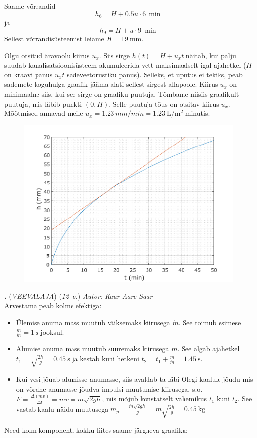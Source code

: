 \documentclass[11pt,a5paper]{article}
\newcommand{\numb}[1]{\vspace{5pt}\textbf{\large #1}}
\newcommand{\nimi}[1]{(\textsl{\small #1})}
\newcommand{\punktid}[1]{(\emph{#1~p.})}
\newcounter{ylesanne}
\newcommand{\yl}[1]{\addtocounter{ylesanne}{1}\numb{\theylesanne.} \nimi{#1} \newblock{}}
\newcommand{\autor}[1]{\emph{Autor: #1}}%
\begin{document}
Saame võrrandid
\[
h_6 = H +0.5 u \cdot \SI{6}{\min}
\]
ja
\[
h_9 = H + u \cdot \SI{9}{\min}
\]
Sellest võrrandisüsteemist leiame $H=\SI{19}{\mm}$.

Olgu otsitud äravoolu kiirus $u_x$. Siis sirge $h(t)=H+u_xt$ näitab, kui palju suudab kanalisatsioonisüsteem akumuleerida vett maksimaalselt igal ajahetkel ($H$ on kraavi panus $u_xt$ sadeveetorustiku panus). Selleks, et uputus ei tekiks, peab sademete koguhulga graafik jääma alati sellest sirgest allapoole. Kiirus $u_x$ on minimaalne siis, kui see sirge on graafiku puutuja. Tõmbame niisiis graafikult puutuja, mis läbib punkti $(0,H)$. Selle puutuja tõus on otsitav kiirus $u_x$. Mõõtmised annavad meile $u_x=\SI{1.23}{mm/min}=\SI{1.23}{\L\per\m\squared}$ minutis.

\begin{figure}[h]
	\vspace{-1em}
    \centering
    \includegraphics[width=0.75\linewidth]{uputus_lah.pdf}
\end{figure}

\newpage
\yl{VEEVALAJA} \punktid{12} \autor{Kaur Aare Saar}\\
Arvestama peab kolme efektiga:
\begin{itemize}
\item Ülemise anuma mass muutub väiksemaks kiirusega $\dot{m}$. See toimub esimese $\frac{m}{\dot{m}}=\SI{1}{\second}$ jooksul.
\item Alumise anuma mass muutub suuremaks kiirusega $\dot{m}$. See algab ajahetkel $t_1=\sqrt{\frac{2h}{g}}= \SI{0.45}{\second}$ ja kestab kuni hetkeni $t_2 = t_1 + \frac{m}{\dot{m}} = \SI{1.45}{\second}$.
\item Kui vesi jõuab alumisse anumasse, siis avaldab ta läbi Olegi kaalule jõudu mis on võrdne anumasse jõudva impulsi muutumise kiirusega, s.o. $F = \frac{\Delta (mv)}{\Delta{t}} = \dot{m}v = \dot{m} \sqrt{2gh}$, mis mõjub konstatselt vahemikus $t_1$ kuni $t_2$. See vastab kaalu näidu muutusega $m_p = \frac{\dot{m} \sqrt{2gh}}{g} = \dot{m}\sqrt{\frac{2h}{g}}= \SI{0.45}{\kilo\gram}$
\end{itemize}
Need kolm komponenti kokku liites saame järgneva graafiku:
\end{document}
